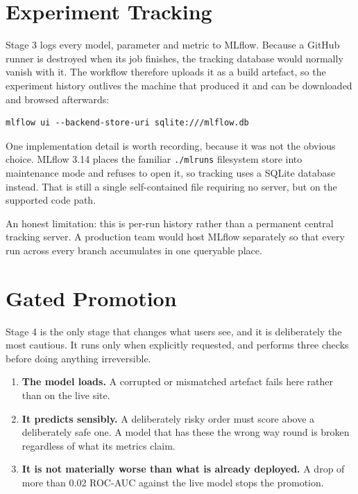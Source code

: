 \documentclass[11pt,a4paper]{report}
\begin{document}
\section{Experiment Tracking}

Stage 3 logs every model, parameter and metric to MLflow. Because a GitHub
runner is destroyed when its job finishes, the tracking database would normally
vanish with it. The workflow therefore uploads it as a build artefact, so the
experiment history outlives the machine that produced it and can be downloaded
and browsed afterwards:

\begin{lstlisting}[caption={Inspecting the tracking history from a pipeline run}]
mlflow ui --backend-store-uri sqlite:///mlflow.db
\end{lstlisting}

One implementation detail is worth recording, because it was not the obvious
choice. MLflow 3.14 places the familiar \texttt{./mlruns} filesystem store into
maintenance mode and refuses to open it, so tracking uses a SQLite database
instead. That is still a single self-contained file requiring no server, but on
the supported code path.

An honest limitation: this is per-run history rather than a permanent central
tracking server. A production team would host MLflow separately so that every
run across every branch accumulates in one queryable place.

\section{Gated Promotion}

Stage 4 is the only stage that changes what users see, and it is deliberately
the most cautious. It runs only when explicitly requested, and performs three
checks before doing anything irreversible.

\begin{enumerate}[leftmargin=*]
\item \textbf{The model loads.} A corrupted or mismatched artefact fails here
rather than on the live site.
\item \textbf{It predicts sensibly.} A deliberately risky order must score above
a deliberately safe one. A model that has these the wrong way round is broken
regardless of what its metrics claim.
\item \textbf{It is not materially worse than what is already deployed.} A drop
of more than 0.02 ROC-AUC against the live model stops the promotion.
\end{enumerate}
\end{document}
